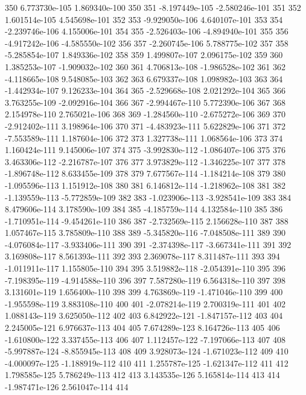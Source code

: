 \documentclass{article}
\begin{document}
\begin{Schunk}
\begin{Soutput}
350   6.773730e-105  1.869340e-100  350
351  -8.197449e-105 -2.580246e-101  351
352   1.601514e-105  4.545698e-101  352
353  -9.929050e-106  4.640107e-101  353
354  -2.239746e-106  4.155006e-101  354
355  -2.526403e-106 -4.894940e-101  355
356  -4.917242e-106 -4.585550e-102  356
357  -2.260745e-106  5.788775e-102  357
358  -5.285854e-107  1.849336e-102  358
359   1.499807e-107  2.096175e-102  359
360   1.385253e-107 -1.909032e-102  360
361   4.706813e-108 -1.986528e-102  361
362  -4.118665e-108  9.548085e-103  362
363   6.679337e-108  1.098982e-103  363
364  -1.442934e-107  9.126233e-104  364
365  -2.529668e-108  2.021292e-104  365
366   3.763255e-109 -2.092916e-104  366
367  -2.994467e-110  5.772390e-106  367
368   2.154978e-110  2.765021e-106  368
369  -1.284560e-110 -2.675272e-106  369
370  -2.912402e-111  3.198964e-106  370
371  -4.483923e-111  5.622829e-106  371
372  -7.553589e-111  1.187604e-106  372
373   1.327738e-111  1.068564e-106  373
374   1.160424e-111  9.145006e-107  374
375  -3.992830e-112 -1.086407e-106  375
376   3.463306e-112 -2.216787e-107  376
377   3.973829e-112 -1.346225e-107  377
378  -1.896748e-112  8.633455e-109  378
379   7.677567e-114 -1.184214e-108  379
380  -1.095596e-113  1.151912e-108  380
381   6.146812e-114 -1.218962e-108  381
382  -1.139559e-113 -5.772859e-109  382
383  -1.023906e-113 -3.928541e-109  383
384   8.479606e-114  3.178590e-109  384
385  -4.185759e-114  4.132584e-110  385
386  -1.710951e-114 -9.454261e-110  386
387  -2.732569e-115  2.156628e-110  387
388   1.057467e-115  3.785809e-110  388
389  -5.345820e-116 -7.048508e-111  389
390  -4.076084e-117 -3.933406e-111  390
391  -2.374398e-117 -3.667341e-111  391
392   3.169808e-117  8.561393e-111  392
393   2.369078e-117  8.311487e-111  393
394  -1.011911e-117  1.155805e-110  394
395   3.519882e-118 -2.054391e-110  395
396  -7.198395e-119 -4.914588e-110  396
397   7.587280e-119  6.564318e-110  397
398   3.131601e-119  1.656400e-110  398
399   4.763869e-119 -1.471046e-110  399
400  -1.955598e-119  3.883108e-110  400
401  -2.078214e-119  2.700319e-111  401
402   1.088143e-119  3.625050e-112  402
403   6.842922e-121 -1.847157e-112  403
404   2.245005e-121  6.976637e-113  404
405   7.674289e-123  8.164726e-113  405
406  -1.610800e-122  3.337455e-113  406
407   1.112457e-122 -7.197066e-113  407
408  -5.997887e-124 -8.855945e-113  408
409   3.928073e-124 -1.671023e-112  409
410  -4.000097e-125 -1.188919e-112  410
411   1.255787e-125 -1.621347e-112  411
412   1.798585e-125  5.786249e-113  412
413   3.143535e-126  5.165814e-114  413
414  -1.987471e-126  2.561047e-114  414

\end{Soutput}
\end{Schunk}
\end{document}
